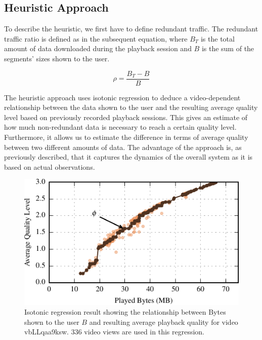 
\subsection{Heuristic Approach}
\label{sec:heu}

To describe the heuristic, we first have to define redundant traffic.
The redundant traffic ratio is defined as in the subsequent equation, where $B_T$ is the total amount of data downloaded during the playback session and $B$ is the sum of the segments' sizes shown to the user.

\begin{equation}
	\rho = \frac{B_T-B}{B}
\end{equation}

The heuristic approach uses isotonic regression \cite{barlow1972statistical} to deduce a video-dependent relationship between the data shown to the user and the resulting average quality level based on previously recorded playback sessions.
This gives an estimate of how much non-redundant data is necessary to reach a certain quality level.
Furthermore, it allows us to estimate the difference in terms of average quality between two different amounts of data.
The advantage of the approach is, as previously described, that it captures the dynamics of the overall system as it is based on actual observations.

\begin{figure}[t]
\centering
\includegraphics[width=\columnwidth]{figs/32_vbLLqaa9ksw.pdf}%
\caption{Isotonic regression result showing the relationship between Bytes shown to the user $B$ and resulting average playback quality for video vbLLqaa9ksw. $336$ video views are used in this regression.}
\label{fig:heuristic}%
\end{figure}

